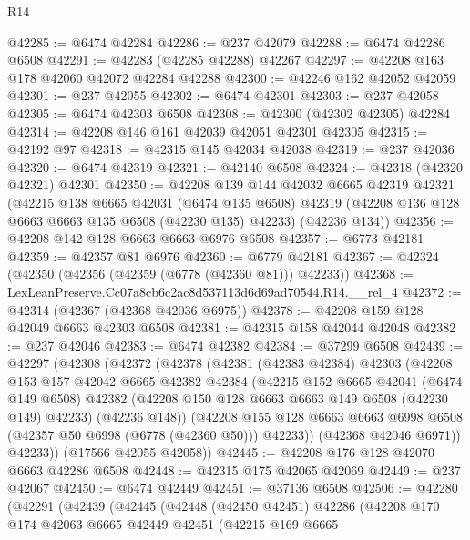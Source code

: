 \begin{lexlean}{R14}
\begin{coremodule}
@42285 := @6474 @42284
@42286 := @237 @42079
@42288 := @6474 @42286 @6508
@42291 := @42283 (@42285 @42288) @42267
@42297 := @42208 @163 @178 @42060 @42072 @42284 @42288
@42300 := @42246 @162 @42052 @42059
@42301 := @237 @42055
@42302 := @6474 @42301
@42303 := @237 @42058
@42305 := @6474 @42303 @6508
@42308 := @42300 (@42302 @42305) @42284
@42314 := @42208 @146 @161 @42039 @42051 @42301 @42305
@42315 := @42192 @97
@42318 := @42315 @145 @42034 @42038
@42319 := @237 @42036
@42320 := @6474 @42319
@42321 := @42140 @6508
@42324 := @42318 (@42320 @42321) @42301
@42350 := @42208
    @139
    @144
    @42032
    @6665
    @42319
    @42321
    (@42215
      @138
      @6665
      @42031
      (@6474 @135 @6508)
      @42319
      (@42208 @136 @128 @6663 @6663 @135 @6508 (@42230 @135) @42233)
      (@42236 @134))
@42356 := @42208 @142 @128 @6663 @6663 @6976 @6508
@42357 := @6773 @42181
@42359 := @42357 @81 @6976
@42360 := @6779 @42181
@42367 := @42324 (@42350 (@42356 (@42359 (@6778 (@42360 @81))) @42233))
@42368 := LexLeanPreserve.Cc07a8cb6c2ac8d537113d6d69ad70544.R14.__rel_4
@42372 := @42314 (@42367 (@42368 @42036 @6975))
@42378 := @42208 @159 @128 @42049 @6663 @42303 @6508
@42381 := @42315 @158 @42044 @42048
@42382 := @237 @42046
@42383 := @6474 @42382
@42384 := @37299 @6508
@42439 := @42297
    (@42308
      (@42372
        (@42378
          (@42381
            (@42383 @42384)
            @42303
            (@42208
              @153
              @157
              @42042
              @6665
              @42382
              @42384
              (@42215
                @152
                @6665
                @42041
                (@6474 @149 @6508)
                @42382
                (@42208 @150 @128 @6663 @6663 @149 @6508 (@42230 @149) @42233)
                (@42236 @148))
              (@42208
                @155
                @128
                @6663
                @6663
                @6998
                @6508
                (@42357 @50 @6998 (@6778 (@42360 @50)))
                @42233))
            (@42368 @42046 @6971))
          @42233))
      (@17566 @42055 @42058))
@42445 := @42208 @176 @128 @42070 @6663 @42286 @6508
@42448 := @42315 @175 @42065 @42069
@42449 := @237 @42067
@42450 := @6474 @42449
@42451 := @37136 @6508
@42506 := @42280
    (@42291
      (@42439
        (@42445
          (@42448
            (@42450 @42451)
            @42286
            (@42208
              @170
              @174
              @42063
              @6665
              @42449
              @42451
              (@42215
                @169
                @6665

\end{coremodule}
\end{lexlean}
